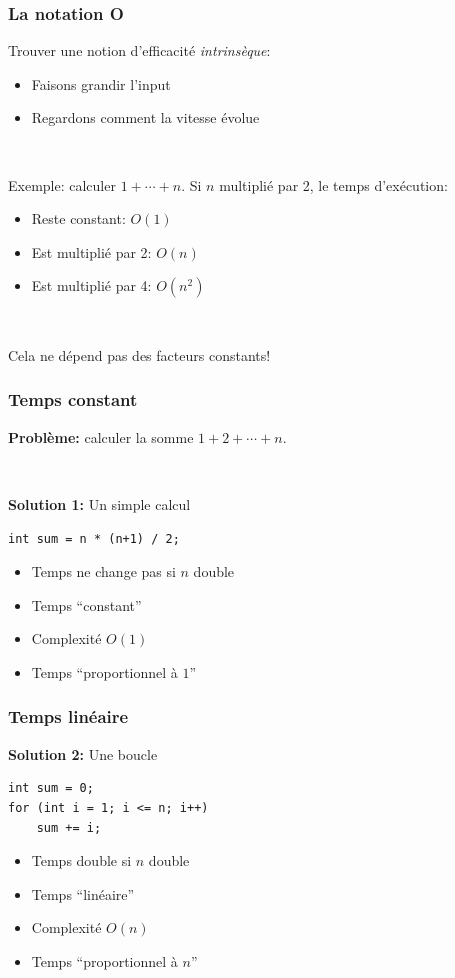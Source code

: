 \documentclass[12pt]{beamer}
\begin{document}
\begin{frame}
\frametitle{La notation O}
Trouver une notion d'efficacité \emph{intrinsèque}:
\begin{itemize}
\item Faisons grandir l'input
\item Regardons comment la vitesse évolue
\end{itemize}

~

Exemple: calculer $1+\cdots+n$. Si $n$ multiplié par 2, le temps d'exécution:
\begin{itemize}
\item Reste constant: $O(1)$
\item Est multiplié par 2: $O(n)$
\item Est multiplié par 4: $O(n^2)$
\end{itemize}

~

Cela ne dépend pas des facteurs constants!
\end{frame}

\begin{frame}[fragile]
\frametitle{Temps constant}
\textbf{Problème:} calculer la somme $1+2+\cdots+n$.

~

\textbf{Solution 1:} Un simple calcul
\begin{lstlisting}
int sum = n * (n+1) / 2;
\end{lstlisting}
\begin{itemize}
\item Temps ne change pas si $n$ double
\item Temps ``constant''
\item Complexité $O(1)$
\item Temps ``proportionnel à $1$''
\end{itemize}
\end{frame}

\begin{frame}[fragile]
\frametitle{Temps linéaire}
\textbf{Solution 2:} Une boucle
\begin{lstlisting}
int sum = 0;
for (int i = 1; i <= n; i++)
    sum += i;
\end{lstlisting}
\begin{itemize}
\item Temps double si $n$ double
\item Temps ``linéaire''
\item Complexité $O(n)$
\item Temps ``proportionnel à $n$''
\end{itemize}
\end{frame}
\end{document}
